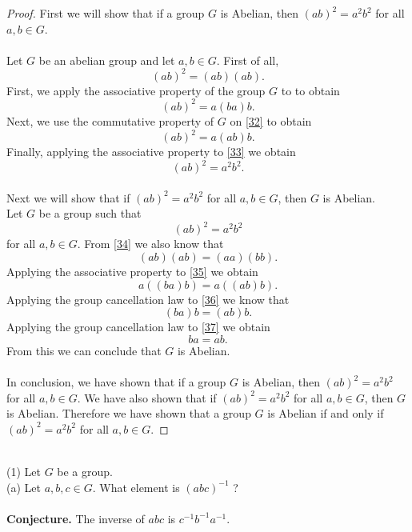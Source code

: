 \documentclass[11pt,a4paper]{article}
\begin{document}
\begin{proof}
First we will show that if a group $G$ is Abelian, then $(ab)^2 = a^2 b^2$ for all $a, b \in G$.\\
~\\
Let $G$ be an abelian group and let $a,b\in G$. First of all,
\begin{equation}\label{31}
(ab)^2 = (ab)(ab).
\end{equation}
First, we apply the associative property of the group $G$ to \label{31} to obtain
\begin{equation}\label{32}
(ab)^2 = a(ba)b.
\end{equation}
Next, we use the commutative property of $G$ on \eqref{32} to obtain
\begin{equation}\label{33}
(ab)^2 = a(ab)b.
\end{equation}
Finally, applying the associative property to \eqref{33} we obtain
\[(ab)^2 = a^2b^2.\]
~\\
Next we will show that if $(ab)^2 = a^2b^2$ for all $a,b\in G$, then $G$ is Abelian.
~\\
Let $G$ be a group such that
\begin{equation}\label{34}
(ab)^2 = a^2b^2
\end{equation}
for all $a,b \in G$. From \eqref{34} we also know that
\begin{equation}\label{35}
(ab)(ab) = (aa)(bb).
\end{equation}
Applying the associative property to \eqref{35} we obtain
\begin{equation}\label{36}
a((ba)b) = a((ab)b).
\end{equation}
Applying the group cancellation law to \eqref{36} we know that
\begin{equation}\label{37}
(ba)b = (ab)b.
\end{equation}
Applying the group cancellation law to \eqref{37} we obtain
\[ba = ab.\]
From this we can conclude that $G$ is Abelian.\\
~\\
In conclusion, we have shown that if a group $G$ is Abelian, then $(ab)^2 = a^2 b^2$ for all $a, b \in G$. We have also shown that if $(ab)^2 = a^2b^2$ for all $a,b\in G$, then $G$ is Abelian. Therefore we have shown that a group $G$ is Abelian if and only if $(ab)^2 = a^2 b^2$ for all $a, b \in G$.
\end{proof}
~\\
(1) Let $G$ be a group.\\
(a) Let $a, b, c \in G$. What element is $(abc)^{-1}$ ?\\
~\\
{\bf Conjecture. } The inverse of $abc$ is $c^{-1}b^{-1}a^{-1}$.
\end{document}
